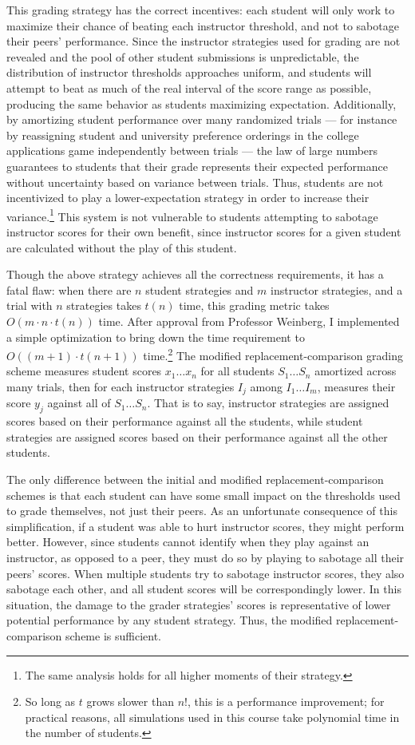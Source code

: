 \documentclass[pageno]{jpaper}
\begin{document}
This grading strategy has the correct incentives: each student will only work to maximize their chance of beating each instructor threshold, and not to sabotage their peers' performance.
Since the instructor strategies used for grading are not revealed and the pool of other student submissions is unpredictable, the distribution of instructor thresholds approaches uniform, and students will attempt to beat as much of the real interval of the score range as possible, producing the same behavior as students maximizing expectation.
Additionally, by amortizing student performance over many randomized trials --- for instance by reassigning student and university preference orderings in the college applications game independently between trials --- the law of large numbers guarantees to students that their grade represents their expected performance without uncertainty based on variance between trials.
Thus, students are not incentivized to play a lower-expectation strategy in order to increase their variance.\footnote{The same analysis holds for all higher moments of their strategy.}
This system is not vulnerable to students attempting to sabotage instructor scores for their own benefit, since instructor scores for a given student are calculated without the play of this student.

Though the above strategy achieves all the correctness requirements, it has a fatal flaw: when there are $n$ student strategies and $m$ instructor strategies, and a trial with $n$ strategies takes $t(n)$ time, this grading metric takes $O(m \cdot n \cdot t(n))$ time.
After approval from Professor Weinberg, I implemented a simple optimization to bring down the time requirement to $O((m+1) \cdot t(n+1))$ time.\footnote{So long as $t$ grows slower than $n! $, this is a performance improvement; for practical reasons, all simulations used in this course take polynomial time in the number of students.}
The modified replacement-comparison grading scheme measures student scores $x_1 \ldots x_n$ for all students $S_1 \ldots S_n$ amortized across many trials, then for each instructor strategies $I_j$ among $I_1 \ldots I_m$, measures their score $y_j$ against all of $S_1 \ldots S_n$.
That is to say, instructor strategies are assigned scores based on their performance against all the students, while student strategies are assigned scores based on their performance against all the other students.

The only difference between the initial and modified replacement-comparison schemes is that each student can have some small impact on the thresholds used to grade themselves, not just their peers.
As an unfortunate consequence of this simplification, if a student was able to hurt instructor scores, they might perform better.
However, since students cannot identify when they play against an instructor, as opposed to a peer, they must do so by playing to sabotage all their peers' scores.
When multiple students try to sabotage instructor scores, they also sabotage each other, and all student scores will be correspondingly lower.
In this situation, the damage to the grader strategies' scores is representative of lower potential performance by any student strategy.
Thus, the modified replacement-comparison scheme is sufficient.
\end{document}
